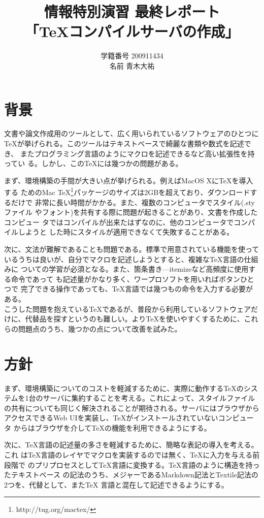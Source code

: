 \documentclass[a4j,9pt,titlepage]{jsarticle}
\title{情報特別演習 最終レポート \\ 「TeXコンパイルサーバの作成」}
\author{学籍番号 200911434 \\ 名前 青木大祐}
\begin{document}
\maketitle
\section{背景}
文書や論文作成用のツールとして、広く用いられているソフトウェアのひとつに
TeXが挙げられる。このツールはテキストベースで綺麗な書類や数式を記述でき、
またプログラミング言語のようにマクロを記述できるなど高い拡張性を持ってい
る。しかし、このTeXには幾つかの問題がある。

まず、環境構築の手間が大きい点が挙げられる。例えばMacOS XにTeXを導入する
ためのMac TeX\footnote{http://tug.org/mactex/}パッケージのサイズは2GBを超えており、ダウンロードするだけで
非常に長い時間がかかる。また、複数のコンピュータでスタイル(.styファイル
やフォント)を共有する際に問題が起きることがあり、文書を作成したコンピュー
タではコンパイルが出来たはずなのに、他のコンピュータでコンパイルしようと
した時にスタイルが適用できなくて失敗することがある。

次に、文法が難解であることも問題である。標準で用意されている機能を使って
いるうちは良いが、自分でマクロを記述しようとすると、複雑なTeX言語の仕組みに
ついての学習が必須となる。また、箇条書き---itemizeなど高頻度に使用する命令であって
も記述量がかなり多く、ワープロソフトを用いればボタンひとつで
完了できる操作であっても、TeX言語では幾つもの命令を入力する必要がある。\\

こうした問題を抱えているTeXであるが、普段から利用しているソフトウェアだ
けに、代替品を探すというのも難しい。よりTeXを使いやすくするために、これ
らの問題点のうち、幾つかの点について改善を試みた。

\section{方針}
まず、環境構築についてのコストを軽減するために、実際に動作するTeXのシス
テムを1台のサーバに集約することを考える。これによって、スタイルファイル
の共有についても同じく解決されることが期待される。サーバにはブラウザから
アクセスできるWeb UIを実装し、TeXがインストールされていないコンピュータ
からはブラウザを介してTeXの機能を利用できるようにする。

次に、TeX言語の記述量の多さを軽減するために、簡略な表記の導入を考える。これ
はTeX言語のレイヤでマクロを実装するのでは無く、TeXに入力を与える前段階で
のプリプロセスとしてTeX言語に変換する。TeX言語のように構造を持ったテキストベース
の記法のうち、メジャーであるMarkdown記法とTextile記法の2つを、代替として、またTeX
言語と混在して記述できるようにする。
\end{document}
